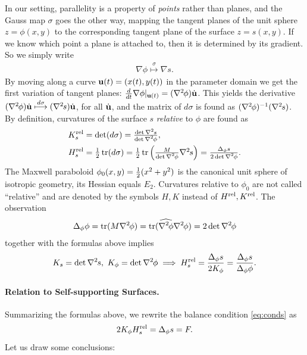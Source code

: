 \documentclass[review]{acmsiggraph}
\def\wh{\widehat}
\def\tr{\mathop{{\rm tr}}\nolimits}
\def\rel{{\mathord{{\rm rel}}}}
\def\ess{s}
\def\Hess#1{{\def\testess{#1}\nabla^2\ifx\testess\ess\!s\else #1\fi}}
\def\Hess#1{\text{$\nabla^2\hskip-.2ex #1$}}
\begin{document}
In our setting, parallelity is a property of {\em points} rather than 
planes, and the Gauss map $\sigma$ goes the other way, mapping the tangent 
planes of the unit sphere $z=\phi(x,y)$ to the corresponding tangent plane 
of the surface $z=s(x,y)$. If we know which point a plane is attached to, 
then it is determined by its gradient. So we simply write
	\begin{align*}
	\nabla \phi\overset\sigma\longmapsto\nabla s.
	\end{align*}
 By moving along a curve ${\mathbf u}(t)=(x(t),y(t))$ in the parameter domain we
get the first variation of tangent planes:
	$
	{d\over dt}\nabla \phi|_{\uw(t)} =
	(\Hess\phi)\dot\uw
	$.
 This yields the derivative
	$	
	(\Hess\phi)\dot\uw \overset{d\sigma}\longmapsto
	(\Hess s)\dot\uw $,
 for all $\dot{{\mathbf u}}$, and the matrix of $d\sigma$ is found as 
$(\Hess\phi)^{-1}(\Hess s)$.  By definition, curvatures of the surface $s$ 
{\em relative} to $\phi$ are found as
	\begin{align*}
		K_s^\rel
	& = \textstyle
		\det(d\sigma) =
		{\det\Hess s \over \det\Hess\phi} ,
	\\
		H_s^\rel
	&= \textstyle
		{1\over 2}\tr(d\sigma)
		= {1\over 2}\tr \left({M\over\det\Hess\phi} \Hess s\right)
		=  {\Delta_\phi s \over 2\det\Hess\phi}.
	\end{align*}
 The Maxwell paraboloid $\phi_0(x,y)={1\over 2}(x^2+y^2)$ is the canonical 
unit sphere of isotropic geometry, its Hessian equals $E_2$. Curvatures 
relative to $\phi_0$ are not called ``relative'' and are denoted by the 
symbols $H,K$ instead of $H^\rel,K^\rel$. The observation
	\begin{align*}
	\Delta_\phi \phi
	= \tr(M \Hess \phi)
	= \tr(\wh{\Hess\phi}\Hess\phi)
	= 2\det\Hess\phi
	\end{align*}
 together with the formulas above implies
	\begin{align*}
		K_s  = \det \Hess s, 
	\
		K_\phi = \det \Hess \phi
	\implies
		H_s^\rel =  {\Delta_\phi s \over 2 K_\phi}
			= {\Delta_\phi s\over \Delta_\phi \phi}.
	\end{align*}

\paragraph{Relation to Self-supporting Surfaces.}

Summarizing the formulas above, 
we rewrite the balance condition \eqref{eq:conds} as
	\begin{equation}
	2 K_\phi H_s^\rel  = \Delta_\phi s = F.
	\label{equigeo}
	\end{equation}
 Let us draw some conclusions:
\end{document}
